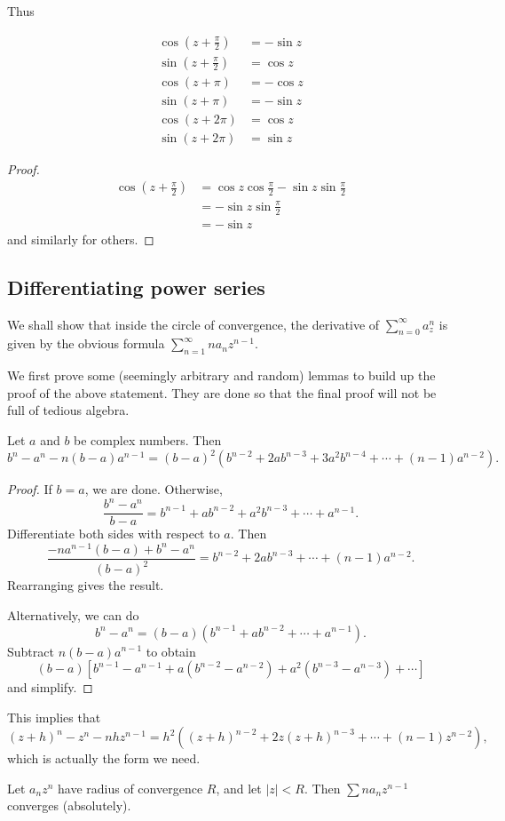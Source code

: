 \documentclass[a4paper]{article}
\begin{document}
Thus
\begin{prop}
  \begin{align*}
    \cos \left(z + \frac{\pi}{2}\right) &= -\sin z\\
    \sin \left(z + \frac{\pi}{2}\right) &= \cos z\\
    \cos (z + \pi) &= -\cos z\\
    \sin (z + \pi) &= -\sin z\\
    \cos (z + 2\pi) &= \cos z\\
    \sin (z + 2\pi) &= \sin z
  \end{align*}
\end{prop}

\begin{proof}
  \begin{align*}
    \cos\left(z + \frac{\pi}{2}\right) &= \cos z\cos \frac{\pi}{2} - \sin z\sin \frac{\pi}{2}\\
    &= -\sin z\sin \frac{\pi}{2}\\
    &= -\sin z
  \end{align*}
  and similarly for others.
\end{proof}
\subsection{Differentiating power series}
We shall show that inside the circle of convergence, the derivative of $\sum_{n = 0}^\infty a_z^n$ is given by the obvious formula $\sum_{n = 1}^\infty na_n z^{n - 1}$.

We first prove some (seemingly arbitrary and random) lemmas to build up the proof of the above statement. They are done so that the final proof will not be full of tedious algebra.

\begin{lemma}
  Let $a$ and $b$ be complex numbers. Then
  \[
    b^n - a^n - n(b - a)a^{n - 1} = (b - a)^2(b^{n - 2} + 2ab^{n - 3} + 3a^2 b^{n - 4} + \cdots + (n - 1)a^{n - 2}).
  \]
\end{lemma}

\begin{proof}
  If $b = a$, we are done. Otherwise,
  \[
    \frac{b^n - a^n}{b - a} = b^{n - 1} + ab^{n - 2} + a^2b^{n - 3} + \cdots + a^{n - 1}.
  \]
  Differentiate both sides with respect to $a$. Then
  \[
    \frac{-na^{n - 1}(b - a) + b^n - a^n}{(b - a)^2} = b^{n - 2} + 2ab^{n - 3} + \cdots + (n - 1)a^{n - 2}.
  \]
  Rearranging gives the result.

  Alternatively, we can do
  \[
    b^n - a^n = (b - a)(b^{n - 1} + ab^{n - 2} + \cdots + a^{n - 1}).
  \]
  Subtract $n(b - a)a^{n - 1}$ to obtain
  \[
    (b - a)[b^{n - 1} - a^{n - 1} + a(b^{n - 2} - a^{n - 2}) + a^2(b^{n - 3} - a^{n -3 }) + \cdots]
  \]
  and simplify.
\end{proof}
This implies that
\[
  (z + h)^n - z^n - nhz^{n - 1} = h^2((z + h)^{n - 2} + 2z(z + h)^{n - 3} + \cdots + (n - 1)z^{n - 2}),
\]
which is actually the form we need.
\begin{lemma}
  Let $a_n z^n$ have radius of convergence $R$, and let $|z| < R$. Then $\sum na_n z^{n - 1}$ converges (absolutely).
\end{lemma}
\end{document}
